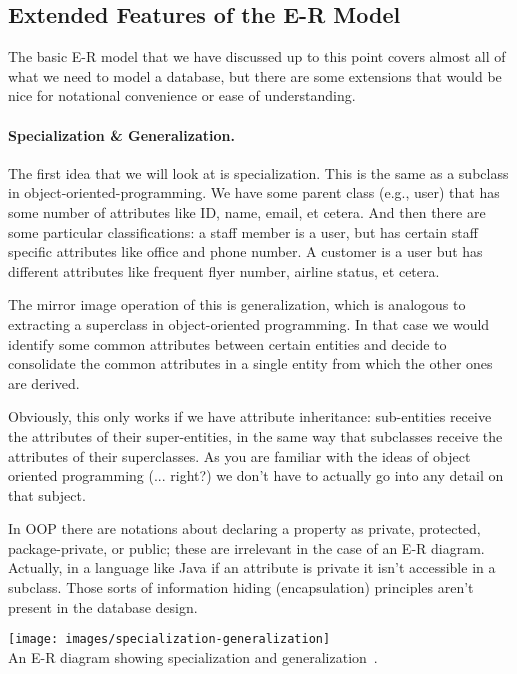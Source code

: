 \documentclass[a4paper]{report}
\begin{document}
\subsection*{Extended Features of the E-R Model}
The basic E-R model that we have discussed up to this point covers almost all of what we need to model a database, but there are some extensions that would be nice for notational convenience or ease of understanding.

\paragraph{Specialization \& Generalization.} The first idea that we will look at is specialization. This is the same as a subclass in object-oriented-programming. We have some parent class (e.g., user) that has some number of attributes like ID, name, email, et cetera. And then there are some particular classifications: a staff member is a user, but has certain staff specific attributes like office and phone number. A customer is a user but has different attributes like frequent flyer number, airline status, et cetera. 

The mirror image operation of this is generalization, which is analogous to extracting a superclass in object-oriented programming. In that case we would identify some common attributes between certain entities and decide to consolidate the common attributes in a single entity from which the other ones are derived.

Obviously, this only works if we have attribute inheritance: sub-entities receive the attributes of their super-entities, in the same way that subclasses receive the attributes of their superclasses. As you are familiar with the ideas of object oriented programming (... right?) we don't have to actually go into any detail on that subject. 

In OOP there are notations about declaring a property as private, protected, package-private, or public; these are irrelevant in the case of an E-R diagram. Actually, in a language like Java if an attribute is private it isn't accessible in a subclass. Those sorts of information hiding (encapsulation) principles aren't present in the database design.

\begin{center}
\texttt{[image: images/specialization-generalization]}\\
An E-R diagram showing specialization and generalization~\cite{dsc}.
\end{center}
\end{document}
